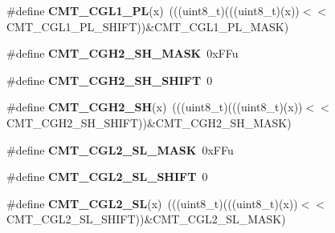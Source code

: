 \begin{DoxyCompactItemize}
\item 
\#define {\bfseries C\+M\+T\+\_\+\+C\+G\+L1\+\_\+\+PL}(x)~(((uint8\+\_\+t)(((uint8\+\_\+t)(x))$<$$<$C\+M\+T\+\_\+\+C\+G\+L1\+\_\+\+P\+L\+\_\+\+S\+H\+I\+FT))\&C\+M\+T\+\_\+\+C\+G\+L1\+\_\+\+P\+L\+\_\+\+M\+A\+SK)\hypertarget{group__CMT__Register__Masks_ga2d042e508373d5fceb72b794eca5e7d1}{}\label{group__CMT__Register__Masks_ga2d042e508373d5fceb72b794eca5e7d1}

\item 
\#define {\bfseries C\+M\+T\+\_\+\+C\+G\+H2\+\_\+\+S\+H\+\_\+\+M\+A\+SK}~0x\+F\+Fu\hypertarget{group__CMT__Register__Masks_ga8637e794f015ee608b47a547e35a72ea}{}\label{group__CMT__Register__Masks_ga8637e794f015ee608b47a547e35a72ea}

\item 
\#define {\bfseries C\+M\+T\+\_\+\+C\+G\+H2\+\_\+\+S\+H\+\_\+\+S\+H\+I\+FT}~0\hypertarget{group__CMT__Register__Masks_gafcef3256a8434ecb052c1e6fa0226459}{}\label{group__CMT__Register__Masks_gafcef3256a8434ecb052c1e6fa0226459}

\item 
\#define {\bfseries C\+M\+T\+\_\+\+C\+G\+H2\+\_\+\+SH}(x)~(((uint8\+\_\+t)(((uint8\+\_\+t)(x))$<$$<$C\+M\+T\+\_\+\+C\+G\+H2\+\_\+\+S\+H\+\_\+\+S\+H\+I\+FT))\&C\+M\+T\+\_\+\+C\+G\+H2\+\_\+\+S\+H\+\_\+\+M\+A\+SK)\hypertarget{group__CMT__Register__Masks_ga95219b8b12ea826848dec3d3287a1b7b}{}\label{group__CMT__Register__Masks_ga95219b8b12ea826848dec3d3287a1b7b}

\item 
\#define {\bfseries C\+M\+T\+\_\+\+C\+G\+L2\+\_\+\+S\+L\+\_\+\+M\+A\+SK}~0x\+F\+Fu\hypertarget{group__CMT__Register__Masks_gafd7f251bad02bcf7549874db413adcf9}{}\label{group__CMT__Register__Masks_gafd7f251bad02bcf7549874db413adcf9}

\item 
\#define {\bfseries C\+M\+T\+\_\+\+C\+G\+L2\+\_\+\+S\+L\+\_\+\+S\+H\+I\+FT}~0\hypertarget{group__CMT__Register__Masks_ga5a5d53932d1fcce0a0f2e9fc29400df8}{}\label{group__CMT__Register__Masks_ga5a5d53932d1fcce0a0f2e9fc29400df8}

\item 
\#define {\bfseries C\+M\+T\+\_\+\+C\+G\+L2\+\_\+\+SL}(x)~(((uint8\+\_\+t)(((uint8\+\_\+t)(x))$<$$<$C\+M\+T\+\_\+\+C\+G\+L2\+\_\+\+S\+L\+\_\+\+S\+H\+I\+FT))\&C\+M\+T\+\_\+\+C\+G\+L2\+\_\+\+S\+L\+\_\+\+M\+A\+SK)\hypertarget{group__CMT__Register__Masks_ga78f805fee13018151bbb94de65001f7e}{}\label{group__CMT__Register__Masks_ga78f805fee13018151bbb94de65001f7e}


\end{DoxyCompactItemize}
